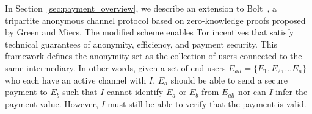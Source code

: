 In Section~\ref{sec:payment_overview}, we describe an extension to Bolt~\cite{green2017bolt}, a tripartite anonymous channel protocol based on zero-knowledge proofs proposed by Green and Miers.
The modified scheme enables Tor incentives that satisfy technical guarantees of anonymity, efficiency, and payment security.
This framework defines the anonymity set as the collection of users connected to the same intermediary.
In other words, given a set of end-users $E_{all} = \{E_1, E_2, ...
E_n\}$ who each have an active channel with $I$, $E_a$ should be able to send a secure payment to $E_b$ such that $I$ cannot identify $E_a$ or $E_b$ from $E_{all}$ nor can $I$ infer the payment value.
However, $I$ must still be able to verify that the payment is valid.

